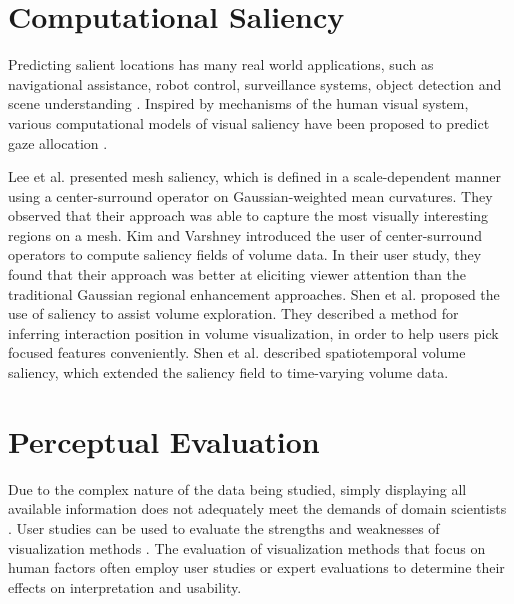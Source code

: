 \section{Computational Saliency}
Predicting salient locations has many real world applications, such as navigational assistance, robot control, surveillance systems, object detection and scene understanding \cite{zhao_learning_2013}.
Inspired by mechanisms of the human visual system, various computational models of visual saliency have been proposed to predict gaze allocation \cite{itti_model_1998} \cite{parkhurst_modeling_2002} \cite{harel_graph-based_2006} \cite{chikkerur_what_2010} \cite{mahadevan_spatiotemporal_2010} \cite{duan_visual_2011}.

Lee et al. \cite{lee_mesh_2005} presented mesh saliency, which is defined in a scale-dependent manner using a center-surround operator on Gaussian-weighted mean curvatures. They observed that their approach was able to capture the most visually interesting regions on a mesh.
Kim and Varshney \cite{kim_saliency-guided_2006} introduced the user of center-surround operators to compute saliency fields of volume data. In their user study, they found that their approach was better at eliciting viewer attention than the traditional Gaussian regional enhancement approaches.
Shen et al. \cite{shen_save:_2014} proposed the use of saliency to assist volume exploration. They described a method for inferring interaction position in volume visualization, in order to help users pick focused features conveniently.
Shen et al. \cite{shen_spatiotemporal_2015} described spatiotemporal volume saliency, which extended the saliency field \cite{kim_saliency-guided_2006} to time-varying volume data.





\section{Perceptual Evaluation}
Due to the complex nature of the data being studied, simply displaying all available information does not adequately meet the demands of domain scientists \cite{anderson_evaluating_2012}.
User studies can be used to evaluate the strengths and weaknesses of visualization methods \cite{christopher_thoughts_2003}.
The evaluation of visualization methods that focus on human factors often employ user studies or expert evaluations to determine their effects on interpretation and usability.

